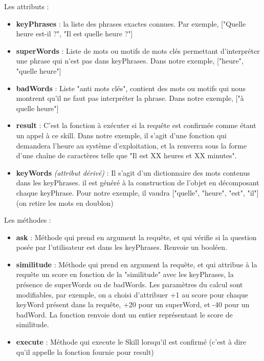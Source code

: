 \documentclass{report}
\begin{document}
        {Les attributs :}
        \begin{itemize}
          \item \textbf{keyPhrases} : la liste des phrases exactes connues. Par exemple, ["Quelle heure est-il ?", "Il est quelle heure ?"]
          \item \textbf{superWords} : Liste de mots ou motifs de mots clés permettant d'interpréter une phrase qui n'est pas dans keyPhrases. Dans notre exemple, ["heure", "quelle heure"]
          \item \textbf{badWords} : Liste "anti mots clés", contient des mots ou motifs qui nous montrent qu'il ne faut pas interpréter la phrase. Dans notre exemple, ["à quelle heure"]
          \item \textbf{result} : C'est la fonction à exécuter si la requête est confirmée comme étant un appel à ce skill. Dans notre exemple, il s'agit d'une fonction qui demandera l'heure au système d'exploitation, et la renverra sous la forme d'une chaîne de caractères telle que "Il est XX heures et XX minutes".
          \item \textbf{keyWords} \textit{(attribut dérivé)} : Il s'agit d'un dictionnaire des mots contenus dans les keyPhrases. il est généré à la construction de l'objet en décomposant chaque keyPhrase. Pour notre exemple, il vaudra ["quelle", "heure", "est", "il"] (on retire les mots en doublon)\newline
        \end{itemize}
        {Les méthodes :}
        \begin{itemize}
          \item \textbf{ask} : Méthode qui prend en argument la requête, et qui vérifie si la question posée par l'utilisateur est dans les keyPhrases. Renvoie un booléen.
          \item \textbf{similitude} : Méthode qui prend en argument la requête, et qui attribue à la requête un score en fonction de la "similitude" avec les keyPhrases, la présence de superWords ou de badWords. Les paramètres du calcul sont modifiables, par exemple, on a choisi d'attribuer +1 au score pour chaque keyWord présent dans la requête, +20 pour un superWord, et -40 pour un badWord. La fonction renvoie dont un entier représentant le score de similitude.
          \item \textbf{execute} : Méthode qui execute le Skill lorsqu'il est confirmé (c'est à dire qu'il appelle la fonction fournie pour result)\newline
        \end{itemize}
\end{document}
